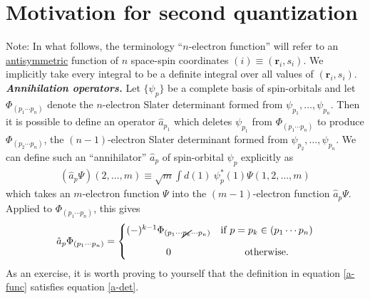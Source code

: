 \documentclass[11pt,fleqn]{article}
\newcommand{\F}{\Phi}        %
\newcommand{\y}{\psi}        %
\newcommand{\Y}{\Psi}        %
\newcommand{\op}[1]{\ensuremath{\hat{#1}}}
\newcommand{\ld}{\ensuremath{\ldots}}
\newcommand{\cd}{\ensuremath{\cdots}}
\newcommand{\bmit}[1]{{\bfseries\itshape\mathversion{bold}#1}}
\newcommand{\bo}[1]{\ensuremath{\mathbf{#1}}}
\newcommand{\ar}[1]{\ensuremath{\begin{matrix}#1\end{matrix}}}
\theoremstyle{mystyle}
\begin{document}
\section*{Motivation for second quantization}

{\small Note: In what follows, the terminology ``$n$-electron function'' will refer to an \underline{antisymmetric} function of $n$ space-spin coordinates $(i)\equiv(\bo{r}_i,s_i)$.  We implicitly take every integral to be a definite integral over all values of $(\bo{r}_i,s_i)$.}\\


\noindent
\bmit{Annihilation operators.}
Let $\{\y_p\}$ be a complete basis of spin-orbitals and let $\F_{(p_1\cd p_n)}$ denote the $n$-electron Slater determinant formed from $\y_{p_1},\ld,\y_{p_n}$.
Then it is possible to define an operator $\op{a}_{p_1}$ which deletes $\y_{p_1}$ from $\F_{(p_1\cd p_n)}$ to produce $\F_{(p_2\cd p_n)}$, the $(n-1)$-electron Slater determinant formed from $\y_{p_2},\ld,\y_{p_n}$.
We can define such an ``annihilator'' $\op{a}_p$ of spin-orbital $\y_p$ explicitly as
\begin{align}
\label{a-func}
  (\op{a}_p\Y)(2,\ld,m)
\equiv
  \sqrt{m}
  \int d(1)\
  \y_p^*(1)\Y(1,2,\ld,m)
\end{align}
which takes an $m$-electron function $\Y$ into the $(m-1)$-electron function $\op{a}_p\Y$.
Applied to $\F_{(p_1\cd p_n)}$, this gives
\begin{align}
\label{a-det}
  \op{a}_p\F_{(p_1\cd p_n)}
=
  \left\{\ar{
    (-)^{k-1}\F_{(p_1\cd \cancel{p_k}\cd p_n)} & \text{if $p=p_k\in (p_1\cd p_n)$}\\[10pt]
    0 & \text{otherwise.}
  }\right.
\end{align}
As an exercise, it is worth proving to yourself that the definition in equation \ref{a-func} satisfies equation \ref{a-det}.\\
\end{document}
